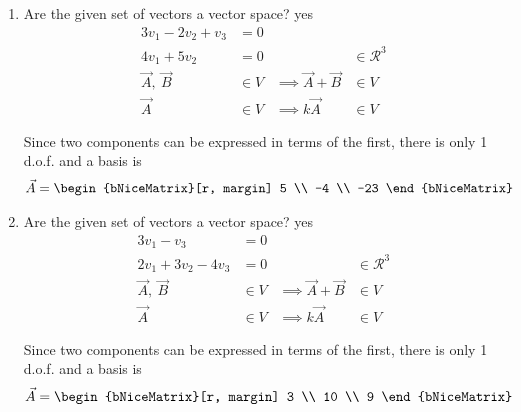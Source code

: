 \begin{enumerate}
    \item Are the given set of vectors a vector space? \textcolor{y_h}{yes}
          \begin{align}
              3v_1 - 2v_2 + v_3          & = 0                 \\
              4v_1 + 5v_2                & = 0               &
                                         & \in \mathcal{R}^3   \\
              \vec{A},\ \vec{B}          & \in V             &
              \implies \vec{A} + \vec{B} & \in V               \\
              \vec{A}                    & \in V             &
              \implies k\vec{A}          & \in V
          \end{align}

          Since two components can be expressed in terms of the first, there is only
          1 d.o.f. and a basis is
          \begin{align}
              \vec{A} & = \begin{bNiceMatrix}[r, margin]
                              5 \\ -4 \\ -23
                          \end{bNiceMatrix}
          \end{align}

    \item Are the given set of vectors a vector space? \textcolor{y_h}{yes}
          \begin{align}
              3v_1 - v_3                 & = 0                 \\
              2v_1 + 3v_2 - 4v_3         & = 0               &
                                         & \in \mathcal{R}^3   \\
              \vec{A},\ \vec{B}          & \in V             &
              \implies \vec{A} + \vec{B} & \in V               \\
              \vec{A}                    & \in V             &
              \implies k\vec{A}          & \in V
          \end{align}

          Since two components can be expressed in terms of the first, there is only
          1 d.o.f. and a basis is
          \begin{align}
              \vec{A} & = \begin{bNiceMatrix}[r, margin]
                              3 \\ 10 \\ 9
                          \end{bNiceMatrix}
          \end{align}


\end{enumerate}
